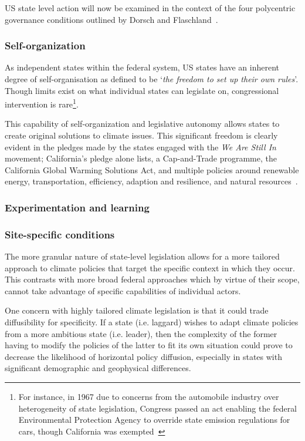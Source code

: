 US state level action will now be examined in the context of the four
polycentric governance conditions outlined by Dorsch and
Flaschland~\citep{dorsch2017polycentric}.


\subsubsection{Self-organization}

As independent states within the federal system, US states have an
inherent degree of self-organisation as defined to be `\textit{the
  freedom to set up their own rules}'. Though limits exist on what
individual states can legislate on, congressional intervention is
rare\footnote{For instance, in 1967 due to concerns from the
  automobile industry over heterogeneity of state legislation, Congress
  passed an act enabling the federal Environmental Protection Agency
  to override state emission regulations for cars, though California
  was exempted~\citep{david2010environmental}}.

This capability of self-organization and legislative autonomy allows
states to create original solutions to climate issues. This
significant freedom is clearly evident in the pledges made by the
states engaged with the \textit{We Are Still In} movement;
California's pledge alone lists, a Cap-and-Trade programme, the
California Global Warming Solutions Act, and multiple policies around
renewable energy, transportation, efficiency, adaption and resilience,
and natural resources~\citep{wearestillin-california}.

\subsubsection{Experimentation and learning}

\subsubsection{Site-specific conditions}

The more granular nature of state-level legislation allows for a more
tailored approach to climate policies that target the specific context
in which they occur. This contrasts with more broad federal approaches
which by virtue of their scope, cannot take advantage of specific
capabilities of individual actors.

One concern with highly tailored climate legislation is that it could
trade diffusibility for specificity. If a state (i.e. laggard) wishes
to adapt climate policies from a more ambitious state (i.e. leader),
then the complexity of the former having to modify the policies of the
latter to fit its own situation could prove to decrease the likelihood
of horizontal policy diffusion, especially in states with significant
demographic and geophysical differences.

